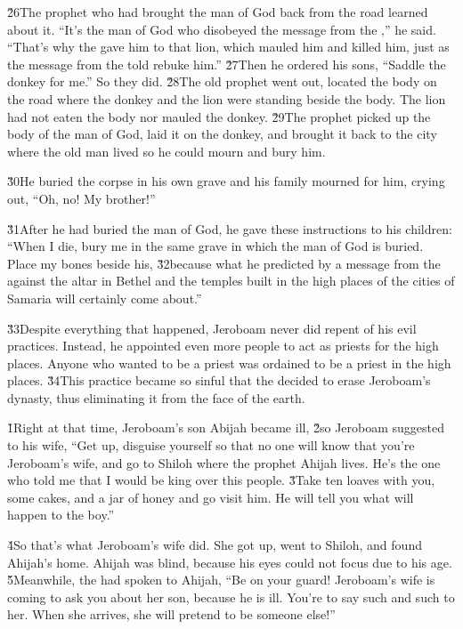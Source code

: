 \v{26}The prophet who had brought the man of God back from the road learned about it. ``It's the man of God who disobeyed the message from the ,'' he said. ``That's why the  gave him to that lion, which mauled him and killed him, just as the message from the  told rebuke him.'' \v{27}Then he ordered his sons, ``Saddle the donkey for me.'' So they did. \v{28}The old prophet went out, located the body on the road where the donkey and the lion were standing beside the body. The lion had not eaten the body nor mauled the donkey. \v{29}The prophet picked up the body of the man of God, laid it on the donkey, and brought it back to the city where the old man lived so he could mourn and bury him.

\v{30}He buried the corpse in his own grave and his family mourned for him, crying out, ``Oh, no! My brother!''

\v{31}After he had buried the man of God, he gave these instructions to his children: ``When I die, bury me in the same grave in which the man of God is buried. Place my bones beside his, \v{32}because what he predicted by a message from the  against the altar in Bethel and the temples built in the high places of the cities of Samaria will certainly come about.''

\v{33}Despite everything that happened, Jeroboam never did repent of his evil practices. Instead, he appointed even more people to act as priests for the high places. Anyone who wanted to be a priest was ordained to be a priest in the high places. \v{34}This practice became so sinful that the  decided to erase Jeroboam's dynasty, thus eliminating it from the face of the earth.

\v{1}Right at that time, Jeroboam's son Abijah became ill, \v{2}so Jeroboam suggested to his wife, ``Get up, disguise yourself so that no one will know that you're Jeroboam's wife, and go to Shiloh where the prophet Ahijah lives. He's the one who told me that I would be king over this people. \v{3}Take ten loaves with you, some cakes, and a jar of honey and go visit him. He will tell you what will happen to the boy.''

\v{4}So that's what Jeroboam's wife did. She got up, went to Shiloh, and found Ahijah's home. Ahijah was blind, because his eyes could not focus due to his age. \v{5}Meanwhile, the  had spoken to Ahijah, ``Be on your guard! Jeroboam's wife is coming to ask you about her son, because he is ill. You're to say such and such to her. When she arrives, she will pretend to be someone else!''

